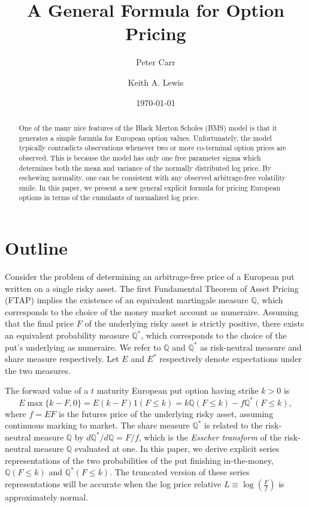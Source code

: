 \documentclass[12pt]{article}
\title{A General Formula for Option Pricing}
\author[1]{Peter Carr}
\author[2]{Keith A. Lewis}
\affil[1]{NYU Tandon School of Engineering}
\affil[2]{KALX, LLC}
\date{\today}
\theoremstyle{definition}
\begin{document}
\maketitle
\begin{abstract}
One of the many nice features of the Black Merton Scholes (BMS)
model is that it generates a simple formula for European option
values. Unfortunately, the model typically contradicts observations
whenever two or more co-terminal option prices are observed. This
is because the model has only one free  parameter sigma which
determines both the mean and variance of the normally distributed log
price. By eschewing normality, one can be consistent with any observed
arbitrage-free volatility smile. In this paper, we present a new general
explicit formula for pricing European options in terms of the cumulants
of normalized log price.


\end{abstract}

\section{Outline}
Consider the problem of determining an arbitrage-free price of 
a European put written on a single risky asset.
The first Fundamental Theorem of Asset Pricing 
(FTAP) implies the existence of an equivalent martingale measure 
$\mathbb{Q}$, which corresponds to the choice of the money market account as numeraire.
Assuming that the final price $F$  of the 
underlying risky asset is strictly positive, 
there exists an equivalent probability measure $\mathbb{Q}^*$,
which corresponds to the choice of the put's underlying as numeraire.
We refer to $\mathbb{Q}$ and $\mathbb{Q}^*$ as risk-neutral measure and share measure respectively. 
Let $E$ and $E^*$ respectively denote expectations under the two measures.

The forward value of a $t$ maturity European put option having strike \(k > 0\) is
\begin{equation}
E \max\{k - F, 0\} = E(k - F)1(F \le k) = k \mathbb{Q} (F\le k) - f \mathbb{Q}^* (F\le k),
\label{afp}
\end{equation}
where $f = E F$ is the futures price of the underlying risky asset,  assuming continuous marking to market. 
The share measure $\mathbb{Q}^*$ is related to the risk-neutral measure 
$\mathbb{Q}$
by $d\mathbb{Q}^*/d\mathbb{Q} = F/f$,
which is the {\em Esscher transform}\cite{Ess1932} of the risk-neutral
measure $\mathbb{Q}$ evaluated at one. In this paper, 
we derive explicit series representations of the two probabilities of
the put finishing in-the-money,
\(\mathbb{Q}(F\le k)\) and \(\mathbb{Q}^*(F\le k)\).
The truncated version of these series representations will be accurate 
when the log price relative  $L \equiv \log \left( \frac{F}{f} \right)$ is approximately normal.
\end{document}

